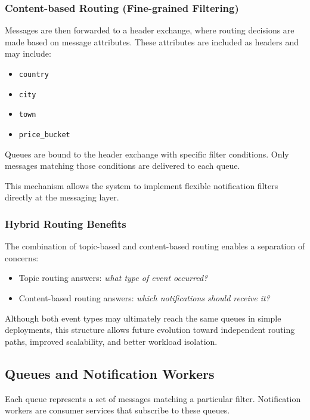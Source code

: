 \subsubsection{Content-based Routing (Fine-grained Filtering)}

Messages are then forwarded to a header exchange, where routing decisions are made based on message attributes. These attributes are included as headers and may include:

\begin{itemize}
    \item \texttt{country}
    \item \texttt{city}
    \item \texttt{town}
    \item \texttt{price\_bucket}
\end{itemize}

Queues are bound to the header exchange with specific filter conditions. Only messages matching those conditions are delivered to each queue.

This mechanism allows the system to implement flexible notification filters directly at the messaging layer.

\subsubsection{Hybrid Routing Benefits}

The combination of topic-based and content-based routing enables a separation of concerns:

\begin{itemize}
    \item Topic routing answers: \textit{what type of event occurred?}
    \item Content-based routing answers: \textit{which notifications should receive it?}
\end{itemize}

Although both event types may ultimately reach the same queues in simple deployments, this structure allows future evolution toward independent routing paths, improved scalability, and better workload isolation.

\subsection{Queues and Notification Workers}

Each queue represents a set of messages matching a particular filter. Notification workers are consumer services that subscribe to these queues.

